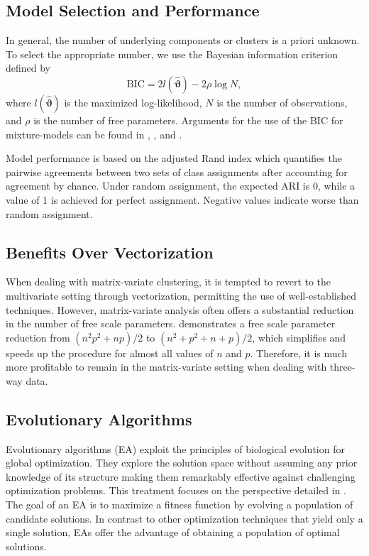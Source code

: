\documentclass[12pt, centerh1]{article}
\begin{document}
\subsection{Model Selection and Performance}
In general, the number of underlying components or clusters is a priori unknown. To select the appropriate number, we use the Bayesian information criterion \citep[BIC;][]{schwarz1978} defined by 
\begin{equation*}
\text{BIC} = 2 l(\hat{\bm{\vartheta}}) - 2 \rho \log N,
\end{equation*}
where $l(\hat{\bm{\vartheta}})$ is the maximized log-likelihood, $N$ is the number of observations, and $\rho$ is the number of free parameters. Arguments for the use of the BIC for mixture-models can be found in \citet{leroux1992}, \citet{keribin2000}, and \citet{dasgupta1998}.

Model performance is based on the adjusted Rand index \citep[ARI;][]{hubert1985} which quantifies the pairwise agreements between two sets of class assignments after accounting for agreement by chance. Under random assignment, the expected ARI is 0, while a value of 1 is achieved for perfect assignment. Negative values indicate worse than random assignment.

\subsection{Benefits Over Vectorization}
When dealing with matrix-variate clustering, it is tempted to revert to the multivariate setting through vectorization, permitting the use of well-established techniques. However, matrix-variate analysis often offers a substantial reduction in the number of free scale parameters. \citet{gallaugher2018} demonstrates a free scale parameter reduction from $(n^2p^2 + np)/2$ to $(n^2 + p^2 + n + p)/2$, which simplifies and speeds up the procedure for almost all values of $n$ and $p$. Therefore, it is much more profitable to remain in the matrix-variate setting when dealing with three-way data. 




\subsection{Evolutionary Algorithms}
Evolutionary algorithms (EA) exploit the principles of biological evolution for global optimization. They explore the solution space without assuming any prior knowledge of its structure making them remarkably effective against challenging optimization problems. This treatment focuses on the perspective detailed in \citet{ashlock2010}. The goal of an EA is to maximize a fitness function by evolving a population of candidate solutions. In contrast to other optimization techniques that yield only a single solution, EAs offer the advantage of obtaining a population of optimal solutions. 
\end{document}

